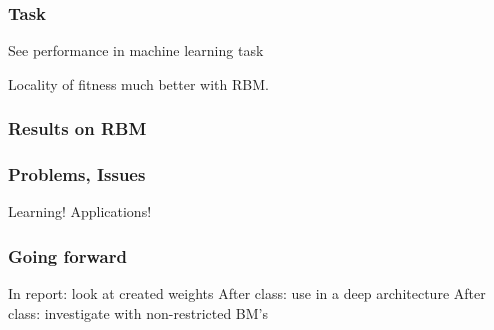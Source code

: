 \documentclass{beamer}
\begin{document}
\begin{frame}
  \frametitle{Task}
  See performance in machine learning task

  Locality of fitness much better with RBM.
\end{frame}

\begin{frame}
  \frametitle{Results on RBM}
  
\end{frame}

\begin{frame}
  \frametitle{Problems, Issues}
  Learning!
  Applications!
\end{frame}

\begin{frame}
  \frametitle{Going forward}
  In report: look at created weights
  After class: use in a deep architecture
  After class: investigate with non-restricted BM's
\end{frame}
\end{document}
